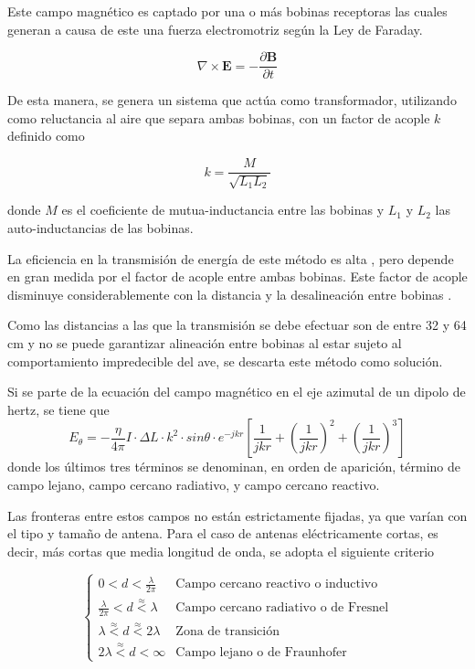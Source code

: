 Este campo magnético es captado por una o más bobinas receptoras las cuales generan a causa de este una fuerza electromotriz según la Ley de Faraday. 

\begin{equation}
\nabla \times \mathbf{E} = -\frac{\partial \mathbf{B}}{\partial t}
\end{equation}

De esta manera, se genera un sistema que actúa como transformador, utilizando como reluctancia al aire que separa ambas bobinas, con un factor de acople $k$ definido como

\begin{equation}
k = \frac{M}{\sqrt{L_1L_2}}
\end{equation}

donde $M$ es el coeficiente de mutua-inductancia entre las bobinas y $L_1$ y $L_2$ las auto-inductancias de las bobinas. 

La eficiencia en la transmisión de energía de este método es alta \cite{ref:wpteff}, pero depende en gran medida por el factor de acople entre ambas bobinas. Este factor de acople disminuye considerablemente con la distancia y la desalineación entre bobinas \cite{ref:wirelesschargingkeyelements} \cite{ref:couplingfactor_1}.

Como las distancias a las que la transmisión se debe efectuar son de entre 32 y 64 cm y no se puede garantizar alineación entre bobinas al estar sujeto al comportamiento impredecible del ave, se descarta este método como solución.


Si se parte de la ecuación del campo magnético en el eje azimutal de un dipolo de hertz, se tiene que
\begin{equation}
E_\theta = -\frac{\eta}{4\pi}I \cdot \Delta L \cdot k^2 \cdot sin\theta \cdot e^{-jkr} \left[ \frac{1}{jkr}+\left( \frac{1}{jkr}\right)^2 + \left(\frac{1}{jkr}\right)^3 \right]
\end{equation}
donde los últimos tres términos se denominan, en orden de aparición, término de campo lejano, campo cercano radiativo, y campo cercano reactivo. 

Las fronteras entre estos campos no están estrictamente fijadas, ya que varían con el tipo y tamaño de antena. Para el caso de antenas eléctricamente cortas, es decir, más cortas que media longitud de onda, se adopta el siguiente criterio

\begin{equation}
\begin{cases} 
          0 < d <\frac{\lambda}{2\pi} & \text{Campo cercano reactivo o inductivo} \\
          \frac{\lambda}{2\pi} < d \overset{\approx}{<} \lambda & \text{Campo cercano radiativo o de Fresnel} \\
          \lambda \overset{\approx}{<} d \overset{\approx}{<} 2\lambda & \text{Zona de transición} \\
          2\lambda \overset{\approx}{<} d < \infty  & \text{Campo lejano o de Fraunhofer} 
       \end{cases}
\end{equation}


